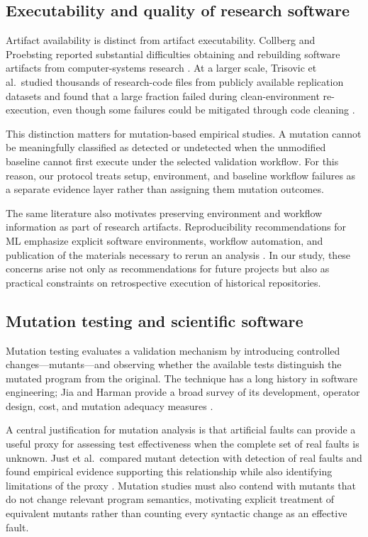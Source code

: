 \subsection{Executability and quality of research software}
\label{sec:related-executability}

Artifact availability is distinct from artifact executability. Collberg and
Proebsting reported substantial difficulties obtaining and rebuilding software
artifacts from computer-systems research \cite{collberg2016repeatability}.
At a larger scale, Trisovic et al.\ studied thousands of research-code files
from publicly available replication datasets and found that a large fraction
failed during clean-environment re-execution, even though some failures could
be mitigated through code cleaning \cite{trisovic2022execution}.

This distinction matters for mutation-based empirical studies. A mutation
cannot be meaningfully classified as detected or undetected when the
unmodified baseline cannot first execute under the selected validation
workflow. For this reason, our protocol treats setup, environment, and baseline
workflow failures as a separate evidence layer rather than assigning them
mutation outcomes.

The same literature also motivates preserving environment and workflow
information as part of research artifacts. Reproducibility recommendations for
ML emphasize explicit software environments, workflow automation, and
publication of the materials necessary to rerun an analysis
\cite{heil2021standards}. In our study, these concerns arise not only as
recommendations for future projects but also as practical constraints on
retrospective execution of historical repositories.


\subsection{Mutation testing and scientific software}
\label{sec:related-mutation}

Mutation testing evaluates a validation mechanism by introducing controlled
changes---mutants---and observing whether the available tests distinguish the
mutated program from the original. The technique has a long history in
software engineering; Jia and Harman provide a broad survey of its development,
operator design, cost, and mutation adequacy measures
\cite{jia2011mutation}.

A central justification for mutation analysis is that artificial faults can
provide a useful proxy for assessing test effectiveness when the complete set
of real faults is unknown. Just et al.\ compared mutant detection with
detection of real faults and found empirical evidence supporting this
relationship while also identifying limitations of the proxy
\cite{just2014mutants}. Mutation studies must also contend with mutants that do
not change relevant program semantics, motivating explicit treatment of
equivalent mutants rather than counting every syntactic change as an effective
fault.

